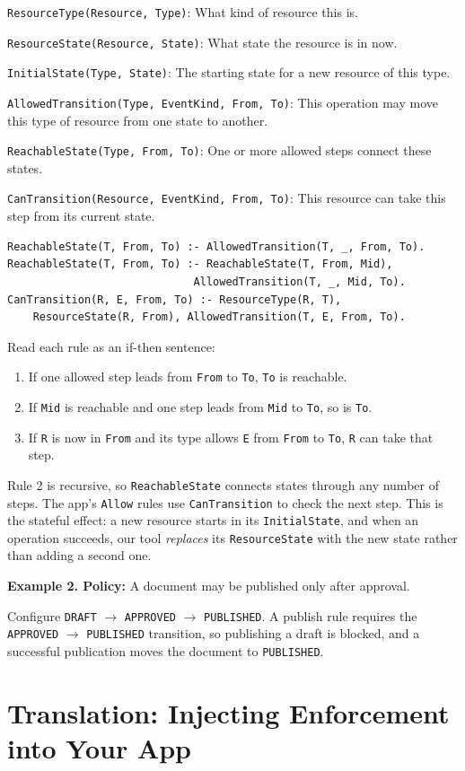 \documentclass[11pt,letter]{article}
\newcommand{\pred}[2]{\texttt{#1}: #2\par}
\begin{document}
\pred{ResourceType(Resource, Type)}{What kind of resource this is.}
\pred{ResourceState(Resource, State)}{What state the resource is in now.}
\pred{InitialState(Type, State)}{The starting state for a new resource of this type.}
\pred{AllowedTransition(Type, EventKind, From, To)}{This operation may move
this type of resource from one state to another.}
\pred{ReachableState(Type, From, To)}{One or more allowed steps connect these states.}
\pred{CanTransition(Resource, EventKind, From, To)}{This resource can take
this step from its current state.}

\begin{lstlisting}
ReachableState(T, From, To) :- AllowedTransition(T, _, From, To).
ReachableState(T, From, To) :- ReachableState(T, From, Mid),
                             AllowedTransition(T, _, Mid, To).
CanTransition(R, E, From, To) :- ResourceType(R, T),
    ResourceState(R, From), AllowedTransition(T, E, From, To).
\end{lstlisting}
Read each rule as an if-then sentence:
\begin{enumerate}
\item If one allowed step leads from \texttt{From} to \texttt{To}, \texttt{To} is reachable.
\item If \texttt{Mid} is reachable and one step leads from \texttt{Mid} to \texttt{To}, so is \texttt{To}.
\item If \texttt{R} is now in \texttt{From} and its type allows \texttt{E} from
\texttt{From} to \texttt{To}, \texttt{R} can take that step.
\end{enumerate}
Rule 2 is recursive, so \texttt{ReachableState} connects states through any
number of steps. The app's \texttt{Allow} rules use \texttt{CanTransition} to
check the next step. This is the stateful effect: a new resource starts in
its \texttt{InitialState}, and when an operation succeeds, our tool
\emph{replaces} its \texttt{ResourceState} with the new state rather than
adding a second one.

\begin{originalpolicy}
\textbf{Example 2. Policy:} A document may be published only after approval.
\end{originalpolicy}
Configure \texttt{DRAFT} $\rightarrow$ \texttt{APPROVED} $\rightarrow$
\texttt{PUBLISHED}. A publish rule requires the
\texttt{APPROVED} $\rightarrow$ \texttt{PUBLISHED} transition, so publishing a
draft is blocked, and a successful publication moves the document to
\texttt{PUBLISHED}.

\section{Translation: Injecting Enforcement into Your App}
\end{document}
